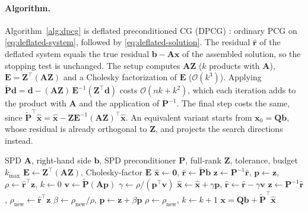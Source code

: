 \paragraph{Algorithm.}
Algorithm~\ref{alg:dpcg} is deflated preconditioned CG (DPCG)
\citep{tang2009comparison}: ordinary PCG on \eqref{eq:deflated-system},
followed by \eqref{eq:deflated-solution}. The residual $\hat{\mathbf{r}}$ of the deflated
system equals the true residual $\mathbf{b} - \mathbf{A}\mathbf{x}$ of the
assembled solution, so the stopping test is unchanged. The setup computes
$\mathbf{A}\mathbf{Z}$ ($k$ products with $\mathbf{A}$), $\mathbf{E} = \mathbf{Z}^\top(\mathbf{A}\mathbf{Z})$
and a Cholesky factorization of $\mathbf{E}$ ($\mathcal{O}(k^3)$). Applying
$\tilde{\mathbf{P}}\mathbf{d} = \mathbf{d} - (\mathbf{A}\mathbf{Z})\,\mathbf{E}^{-1}(\mathbf{Z}^\top\mathbf{d})$
costs $\mathcal{O}(nk + k^2)$, which each iteration adds to the product with
$\mathbf{A}$ and the application of $\mathbf{P}^{-1}$. The final step costs the
same, since $\tilde{\mathbf{P}}^\top\hat{\mathbf{x}} = \hat{\mathbf{x}} - \mathbf{Z}\mathbf{E}^{-1}(\mathbf{A}\mathbf{Z})^\top\hat{\mathbf{x}}$.
An equivalent variant \citep{saad2000deflated} starts from
$\mathbf{x}_0 = \mathbf{Q}\mathbf{b}$, whose residual is already orthogonal to
$\mathbf{Z}$, and projects the search directions instead.

\begin{algorithm}[h]
  \caption{Deflated preconditioned conjugate gradient (DPCG)}
  \label{alg:dpcg}
  \begin{algorithmic}[1]
    \Require SPD $\mathbf{A}$, right-hand side $\mathbf{b}$, SPD preconditioner $\mathbf{P}$, full-rank $\mathbf{Z}$, tolerance, budget $k_{\max}$
    \State $\mathbf{E} \gets \mathbf{Z}^\top(\mathbf{A}\mathbf{Z})$, Cholesky-factor $\mathbf{E}$ 
    \State $\hat{\mathbf{x}} \gets \mathbf{0}$, \quad $\hat{\mathbf{r}} \gets \tilde{\mathbf{P}}\mathbf{b}$
    \State $\mathbf{z} \gets \mathbf{P}^{-1}\hat{\mathbf{r}}$, \quad $\mathbf{p} \gets \mathbf{z}$, \quad $\rho \gets \hat{\mathbf{r}}^\top\mathbf{z}$, \quad $k \gets 0$
    \Repeat
      \State $\mathbf{v} \gets \tilde{\mathbf{P}}(\mathbf{A}\mathbf{p})$  \label{alg:dpcg:project}
      \State $\gamma \gets \rho / (\mathbf{p}^\top\mathbf{v})$
      \State $\hat{\mathbf{x}} \gets \hat{\mathbf{x}} + \gamma\mathbf{p}$, \quad $\hat{\mathbf{r}} \gets \hat{\mathbf{r}} - \gamma\mathbf{v}$
      \State $\mathbf{z} \gets \mathbf{P}^{-1}\hat{\mathbf{r}}$, \quad $\rho_{\text{new}} \gets \hat{\mathbf{r}}^\top\mathbf{z}$
      \State $\beta \gets \rho_{\text{new}} / \rho$, \quad $\mathbf{p} \gets \mathbf{z} + \beta\mathbf{p}$
      \State $\rho \gets \rho_{\text{new}}$, \quad $k \gets k + 1$
    \State \Return $\mathbf{x} = \mathbf{Q}\mathbf{b} + \tilde{\mathbf{P}}^\top\hat{\mathbf{x}}$
  \end{algorithmic}
\end{algorithm}

